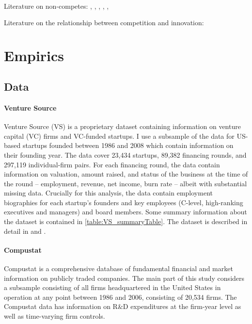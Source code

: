 \documentclass[12pt,english]{article}
\theoremstyle{remark}
\begin{document}
Literature on non-competes: \cite{saxenian_regional_1994}, \cite{gilson_legal_1999}, \cite{jeffers_impact_2018}, \cite{marx_mobility_2009}, \cite{marx_regional_2015}, \cite{starr_noncompetes_2019}

Literature on the relationship between competition and innovation: \cite{aghion_competition_2005}

\section{Empirics}

\subsection{Data}

\paragraph{Venture Source}

Venture Source (VS) is a proprietary dataset containing information on venture capital (VC) firms and VC-funded startups. I use a subsample of the data for US-based startups founded between 1986 and 2008 which contain information on their founding year. The data cover 23,434 startups, 89,382 financing rounds, and 297,119 individual-firm pairs. For each financing round, the data contain information on valuation, amount raised, and status of the business at the time of the round -- employment, revenue, net income, burn rate -- albeit with substantial missing data. Crucially for this analysis, the data contain employment biographies for each startup's founders and key employees (C-level, high-ranking executives and managers) and board members. Some summary information about the dataset is contained in \autoref{table:VS_summaryTable}. The dataset is described in detail in \cite{kaplan_how_2002} and \cite{kaplan_venture_2016}. 

\paragraph{Compustat}

Compustat is a comprehensive database of fundamental financial and market information on publicly traded companies. The main part of this study considers a subsample consisting of all firms headquartered in the United States in operation at any point between 1986 and 2006, consisting of 20,534 firms. The Compustat data has information on R\&D expenditures at the firm-year level as well as time-varying firm controls.
\end{document}
